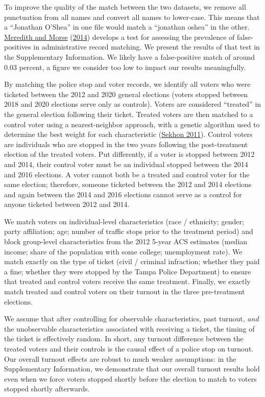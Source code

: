 \documentclass[
  12pt,
]{article}
\begin{document}
To improve the quality of the match between the two datasets, we remove all punctuation from all names and convert all names to lower-case. This means that a ``Jonathan O'Shea'' in one file would match a ``jonathan oshea'' in the other. \protect\hyperlink{ref-Meredith2014}{Meredith and Morse} (\protect\hyperlink{ref-Meredith2014}{2014}) develops a test for assessing the prevalence of false-positives in administrative record matching. We present the results of that test in the Supplementary Information. We likely have a false-positive match of around 0.03 percent, a figure we consider too low to impact our results meaningfully.

By matching the police stop and voter records, we identify all voters who were ticketed between the 2012 and 2020 general elections (voters stopped between 2018 and 2020 elections serve only as controls). Voters are considered ``treated'' in the general election following their ticket. Treated voters are then matched to a control voter using a nearest-neighbor approach, with a genetic algorithm used to determine the best weight for each characteristic (\protect\hyperlink{ref-Sekhon2011}{Sekhon 2011}). Control voters are individuals who are stopped in the two years following the post-treatment election of the treated voters. Put differently, if a voter is stopped between 2012 and 2014, their control voter must be an individual stopped between the 2014 and 2016 elections. A voter cannot both be a treated and control voter for the same election; therefore, someone ticketed between the 2012 and 2014 elections and again between the 2014 and 2016 elections cannot serve as a control for anyone ticketed between 2012 and 2014.

We match voters on individual-level characteristics (race / ethnicity; gender; party affiliation; age; number of traffic stops prior to the treatment period) and block group-level characteristics from the 2012 5-year ACS estimates (median income; share of the population with some college; unemployment rate). We match exactly on the type of ticket (civil / criminal infraction; whether they paid a fine; whether they were stopped by the Tampa Police Department) to ensure that treated and control voters receive the same treatment. Finally, we exactly match treated and control voters on their turnout in the three pre-treatment elections.

We assume that after controlling for observable characteristics, past turnout, \emph{and} the unobservable characteristics associated with receiving a ticket, the timing of the ticket is effectively random. In short, any turnout difference between the treated voters and their controls is the causal effect of a police stop on turnout. Our overall turnout effects are robust to much weaker assumptions: in the Supplementary Information, we demonstrate that our overall turnout results hold even when we force voters stopped shortly before the election to match to voters stopped shortly afterwards.
\end{document}
